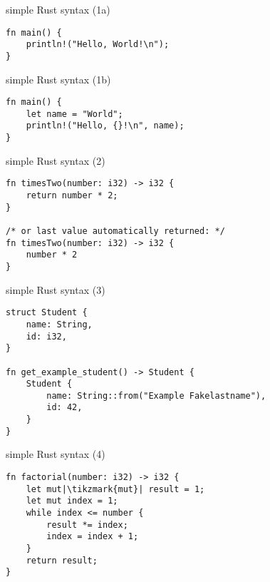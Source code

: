 \usetikzlibrary{positioning,shapes.callouts}
\begin{frame}[fragile,label=rustHelloWorld1]{simple Rust syntax (1a)}
\begin{verbatim}
fn main() {
    println!("Hello, World!\n");
}
\end{verbatim}
\end{frame}

\begin{frame}[fragile,label=rustHelloWorld1]{simple Rust syntax (1b)}
\begin{verbatim}
fn main() {
    let name = "World";
    println!("Hello, {}!\n", name);
}
\end{verbatim}
\end{frame}

\begin{frame}[fragile,label=rustHelloWorld2]{simple Rust syntax (2)}
\begin{verbatim}
fn timesTwo(number: i32) -> i32 {
    return number * 2;
}

/* or last value automatically returned: */
fn timesTwo(number: i32) -> i32 {
    number * 2
}
\end{verbatim}
\end{frame}

\begin{frame}[fragile,label=rustHelloWorld3]{simple Rust syntax (3)}
    \begin{verbatim}
struct Student {
    name: String,
    id: i32,
}

fn get_example_student() -> Student {
    Student {
        name: String::from("Example Fakelastname"),
        id: 42,
    }
}
\end{verbatim}
\end{frame}

\begin{frame}[fragile,label=rustHelloWorld4]{simple Rust syntax (4)}
    \begin{verbatim}
fn factorial(number: i32) -> i32 {
    let mut|\tikzmark{mut}| result = 1;
    let mut index = 1;
    while index <= number {
        result *= index;
        index = index + 1;
    }
    return result;
}
\end{verbatim}
\end{frame}

